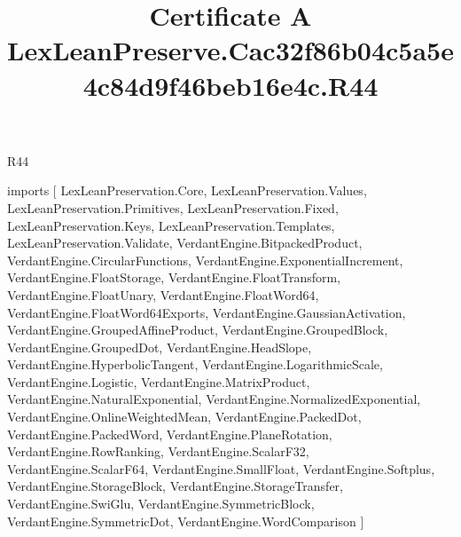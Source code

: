 \begin{lexlean}{R44}
\title{Certificate A LexLeanPreserve.Cac32f86b04c5a5e4c84d9f46beb16e4c.R44}
\begin{coremodule}
imports [
  LexLeanPreservation.Core,
  LexLeanPreservation.Values,
  LexLeanPreservation.Primitives,
  LexLeanPreservation.Fixed,
  LexLeanPreservation.Keys,
  LexLeanPreservation.Templates,
  LexLeanPreservation.Validate,
  VerdantEngine.BitpackedProduct,
  VerdantEngine.CircularFunctions,
  VerdantEngine.ExponentialIncrement,
  VerdantEngine.FloatStorage,
  VerdantEngine.FloatTransform,
  VerdantEngine.FloatUnary,
  VerdantEngine.FloatWord64,
  VerdantEngine.FloatWord64Exports,
  VerdantEngine.GaussianActivation,
  VerdantEngine.GroupedAffineProduct,
  VerdantEngine.GroupedBlock,
  VerdantEngine.GroupedDot,
  VerdantEngine.HeadSlope,
  VerdantEngine.HyperbolicTangent,
  VerdantEngine.LogarithmicScale,
  VerdantEngine.Logistic,
  VerdantEngine.MatrixProduct,
  VerdantEngine.NaturalExponential,
  VerdantEngine.NormalizedExponential,
  VerdantEngine.OnlineWeightedMean,
  VerdantEngine.PackedDot,
  VerdantEngine.PackedWord,
  VerdantEngine.PlaneRotation,
  VerdantEngine.RowRanking,
  VerdantEngine.ScalarF32,
  VerdantEngine.ScalarF64,
  VerdantEngine.SmallFloat,
  VerdantEngine.Softplus,
  VerdantEngine.StorageBlock,
  VerdantEngine.StorageTransfer,
  VerdantEngine.SwiGlu,
  VerdantEngine.SymmetricBlock,
  VerdantEngine.SymmetricDot,
  VerdantEngine.WordComparison
]


\end{coremodule}
\end{lexlean}
